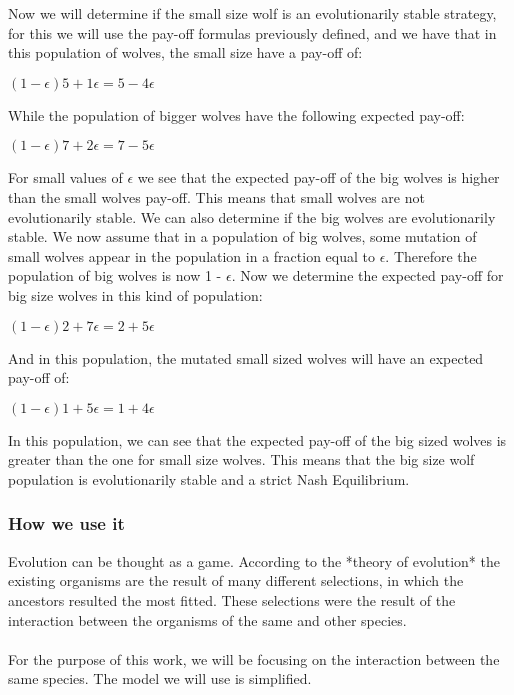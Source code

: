 \documentclass{article}
\begin{document}
Now we will determine if the small size wolf is an evolutionarily stable strategy, for this we will use the pay-off formulas previously defined, and we have that in this population of wolves, the small size have a pay-off of:
\begin{center}
$(1-{\epsilon})5 + 1{\epsilon} = 5 - 4{\epsilon}$
\end{center}
While the population of bigger wolves have the following expected pay-off:
\begin{center}
$(1-{\epsilon})7 + 2{\epsilon} = 7 - 5{\epsilon}$
\end{center}
For small values of $\epsilon$ we see that the expected pay-off of the big wolves is higher than the small wolves pay-off.  This means that small wolves are not evolutionarily stable.
We can also determine if the big wolves are evolutionarily stable. We now assume that in a population of big wolves, some mutation of small wolves appear in the population in a fraction equal to $\epsilon$. Therefore the population of big wolves is now 1 - $\epsilon$. Now we determine the expected pay-off for big size wolves in this kind of population:
 \begin{center}
$(1-{\epsilon})2 + 7{\epsilon} = 2 + 5{\epsilon}$
\end{center}
And in this population, the mutated small sized wolves will have an expected pay-off of:
\begin{center}
$(1-{\epsilon})1 + 5{\epsilon} = 1 + 4{\epsilon}$
\end{center}
In this population, we can see that the expected pay-off of the big sized wolves is greater than the one for small size wolves. This means that the big size wolf population is evolutionarily stable and a strict Nash Equilibrium.

\subsubsection{How we use it}

Evolution can be thought as a game. According to the *theory of evolution* the existing organisms are the result of many different selections, in which the ancestors resulted the most fitted. These selections were the result of the interaction between the organisms of the same and other species.
\\\\For the purpose of this work, we will be focusing on the interaction between the same species. The model we will use is simplified.
\end{document}
